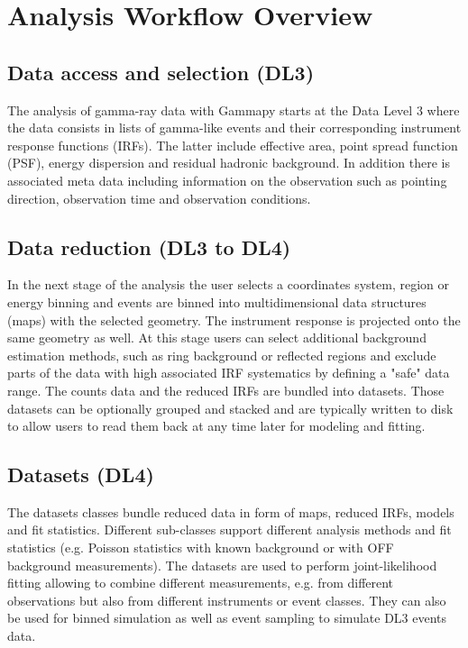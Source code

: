 \section{Analysis Workflow Overview}
\label{sec:analysis-workflow-overview}

\subsection{Data access and selection (DL3)}

The analysis of gamma-ray data with Gammapy starts at the Data Level 3 where the data consists
in lists of gamma-like events and their corresponding instrument response functions (IRFs).
The latter include effective area, point spread function (PSF), energy dispersion and
residual hadronic background. In addition there is associated meta data including information
on the observation such as pointing direction, observation time and observation conditions.

\subsection{Data reduction (DL3 to DL4)}

In the next stage of the analysis the user selects a coordinates system, region or
energy binning and events are binned into multidimensional data structures (maps)
with the selected geometry. The instrument response is projected onto the
same geometry as well. At this stage users can select additional background
estimation methods, such as ring background or reflected regions and
exclude parts of the data with high associated IRF systematics by defining
a "safe" data range. The counts data and the reduced IRFs are bundled into
datasets. Those datasets can be optionally grouped and stacked and are
typically written to disk to allow users to read them back at any time later
for modeling and fitting.

\subsection{Datasets (DL4)}

The datasets classes bundle reduced data in form of maps, reduced IRFs, models and
fit statistics. Different sub-classes support different analysis methods
and fit statistics (e.g. Poisson statistics with known background or
with OFF background measurements). The datasets are used to perform joint-likelihood
fitting allowing to combine different measurements, e.g. from different observations
but also from different instruments or event classes. They can also be used for binned
simulation as well as event sampling to simulate DL3 events data.

